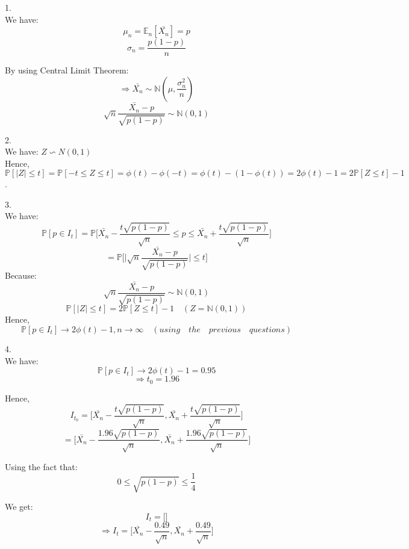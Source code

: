 \documentclass[10pt]{article}
\newenvironment{problem}[2][Problem]{\begin{trivlist}
\item[\hskip \labelsep {\bfseries #1}\hskip \labelsep {\bfseries #2.}]}{\end{trivlist}}
\begin{document}
\begin{problem}{3}
\item 1. \\

We have:\\
\[\mu_n=\mathbb{E}_n[\bar{X_n}]=p\]
\[\sigma_n=\frac{p(1-p)}{n}\]

By using Central Limit Theorem:\\
\[\Rightarrow \bar{X_n}\sim \mathbb{N}(\mu,\frac{\sigma_n^2}{n} )\]
\[\sqrt{n}\frac{\bar{X_n}-p}{\sqrt{p(1-p)}}\sim \mathbb{N}(0,1)\]
\item 2. \\

We have: $Z \backsim N(0,1)$\\

Hence, $\mathbb{P}[|Z| \leqslant t]=\mathbb{P}[-t\leqslant Z \leqslant t]= \phi(t)-\phi(-t)= \phi(t)-(1-\phi(t))=2\phi(t)-1= 2\mathbb{P}[Z \leqslant t]-1$.

\item 3. \\

We have:\\
\[\mathbb{P}[p \in I_t]=\mathbb{P}\Big[\bar{X_n}- \frac{t\sqrt{p(1-p)}}{\sqrt{n}}\leqslant p \leqslant\bar{X_n}+ \frac{t\sqrt{p(1-p)}}{\sqrt{n}} \Big]\]
\[=\mathbb{P}\Big[ \Big|\sqrt{n}\frac{\bar{X_n}-p}{\sqrt{p(1-p)}}\Big|\leqslant t\Big]\]
Because:
\[\sqrt{n}\frac{\bar{X_n}-p}{\sqrt{p(1-p)}}\sim \mathbb{N}(0,1)\]
\[\mathbb{P}[|Z| \leqslant t]=2\mathbb{P}[Z \leqslant t]-1\quad (Z=\mathbb{N}(0,1))\]
Hence, \\
\[\mathbb{P}[p \in I_t]\rightarrow 2\phi(t)-1, n\rightarrow\infty \quad (using\quad the \quad previous \quad questions)\]

\item 4. \\

We have:\\
\[\mathbb{P}[p \in I_t]\rightarrow 2\phi(t)-1=0.95\]
\[\Rightarrow {t_0}=1.96\]

Hence, \\
\[I_{t_0}=\Big[\bar{X_n}- \frac{t\sqrt{p(1-p)}}{\sqrt{n}}, \bar{X_n}+ \frac{t\sqrt{p(1-p)}}{\sqrt{n}} \Big]\]
\[=\Big[\bar{X_n}- \frac{1.96\sqrt{p(1-p)}}{\sqrt{n}}, \bar{X_n}+ \frac{1.96\sqrt{p(1-p)}}{\sqrt{n}} \Big]\]

Using the fact that: \\
\[0 \leqslant\sqrt{p(1-p)} \leqslant \frac{1}{4}\]

We get: \\
\[I_t=\Big[ \Big]\]
\[\Rightarrow I_t=\Big[ \bar{X_n}-\frac{0.49}{\sqrt{n}},\bar{X_n}+\frac{0.49}{\sqrt{n}} \Big]\]


\end{problem}
\end{document}

